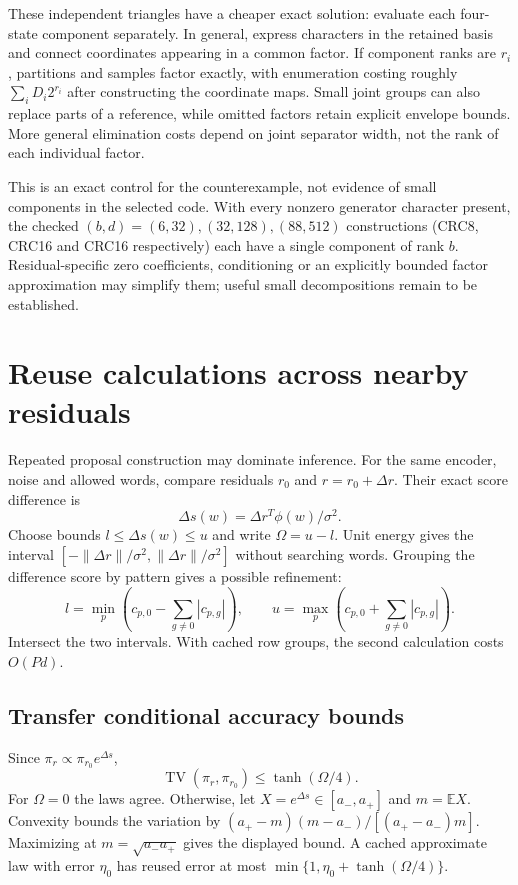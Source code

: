\documentclass[10pt,a4paper]{article}
\newcommand{\E}{\mathbb E}
\newcommand{\TV}{\operatorname{TV}}
\begin{document}
These independent triangles have a cheaper exact solution: evaluate each four-state component separately.
In general, express characters in the retained basis and connect coordinates appearing in a common factor.
If component ranks are $r_i$, partitions and samples factor exactly, with enumeration costing roughly
$\sum_iD_i2^{r_i}$ after constructing the coordinate maps. Small joint groups can also replace parts of
a reference, while omitted factors retain explicit envelope bounds. More general elimination costs depend
on joint separator width, not the rank of each individual factor.

This is an exact control for the counterexample, not evidence of small components in the selected code.
With every nonzero generator character present, the checked $(b,d)=(6,32),(32,128),(88,512)$ constructions
(CRC8, CRC16 and CRC16 respectively) each have a single component of rank $b$.
Residual-specific zero coefficients, conditioning or an explicitly
bounded factor approximation may simplify them; useful small decompositions remain to be established.

\section{Reuse calculations across nearby residuals}
\label{sec:reuse}
Repeated proposal construction may dominate inference. For the same encoder, noise and allowed words,
compare residuals $r_0$ and $r=r_0+\Delta r$. Their exact score difference is
\[
 \Delta s(w)=\Delta r^T\phi(w)/\sigma^2.
\]
Choose bounds $l\leq\Delta s(w)\leq u$ and write $\Omega=u-l$. Unit energy gives the interval
$[-\|\Delta r\|/\sigma^2,\|\Delta r\|/\sigma^2]$ without searching words. Grouping the difference
score by pattern gives a possible refinement:
\[
 l=\min_p\left(c_{p,0}-\sum_{g\ne0}|c_{p,g}|\right),\qquad
 u=\max_p\left(c_{p,0}+\sum_{g\ne0}|c_{p,g}|\right).
\]
Intersect the two intervals. With cached row groups, the second calculation costs $O(Pd)$.

\subsection{Transfer conditional accuracy bounds}
Since $\pi_r\propto\pi_{r_0}e^{\Delta s}$,
\begin{equation}
 \TV(\pi_r,\pi_{r_0})\leq\tanh(\Omega/4).
 \label{eq:reuse-tv}
\end{equation}
For $\Omega=0$ the laws agree. Otherwise, let $X=e^{\Delta s}\in[a_-,a_+]$ and $m=\E X$. Convexity bounds the variation by
$(a_+-m)(m-a_-)/[(a_+-a_-)m]$. Maximizing at $m=\sqrt{a_-a_+}$ gives the displayed bound.
A cached approximate law with error $\eta_0$ has reused error at most
$\min\{1,\eta_0+\tanh(\Omega/4)\}$.
\end{document}
